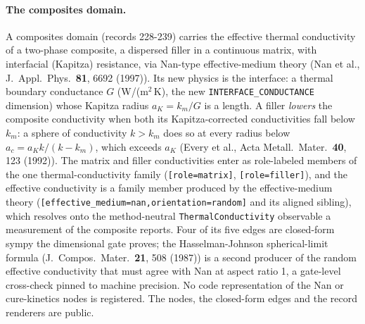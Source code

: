 \documentclass[11pt,a4paper]{article}
\begin{document}
\paragraph{The composites domain.} A composites domain (records 228-239) carries
the effective thermal conductivity of a two-phase composite, a dispersed filler
in a continuous matrix, with interfacial (Kapitza) resistance, via Nan-type
effective-medium theory (Nan et al., J.\ Appl.\ Phys.\ \textbf{81}, 6692 (1997)).
Its new physics is the interface: a thermal boundary conductance $G$ (W/(m$^2$\,K),
the new \texttt{INTERFACE\_CONDUCTANCE} dimension) whose Kapitza radius
$a_K = k_m / G$ is a length. A filler \emph{lowers} the composite conductivity
when both its Kapitza-corrected conductivities fall below $k_m$: a sphere of
conductivity $k > k_m$ does so at every radius below $a_c = a_K k/(k - k_m)$,
which exceeds $a_K$ (Every et al., Acta Metall.\ Mater.\ \textbf{40}, 123 (1992)). The matrix and filler conductivities
enter as role-labeled members of the one thermal-conductivity family
(\texttt{[role=matrix]}, \texttt{[role=filler]}), and the effective conductivity
is a family member produced by the effective-medium theory
(\texttt{[effective\_medium=nan,orientation=random]} and its aligned sibling),
which resolves onto the method-neutral \texttt{ThermalConductivity} observable a
measurement of the composite reports. Four of its five edges are closed-form
sympy the dimensional gate proves; the Hasselman-Johnson spherical-limit formula
(J.\ Compos.\ Mater.\ \textbf{21}, 508 (1987)) is a second producer of the
random effective conductivity that must agree with Nan at aspect ratio 1, a
gate-level cross-check pinned to machine precision. No code representation of
the Nan or cure-kinetics nodes is registered. The nodes, the closed-form edges and
the record renderers are public.
\end{document}
